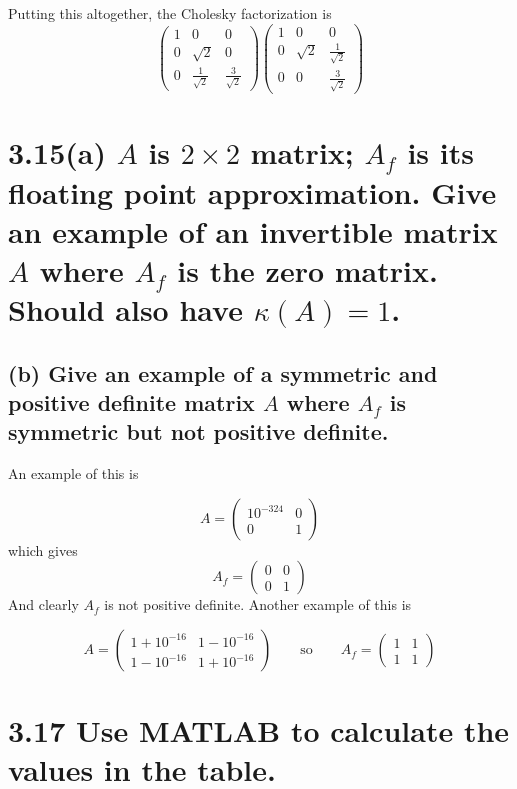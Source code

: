 \documentclass{article}
\begin{document}
Putting this altogether, the Cholesky factorization is
\[
\begin{pmatrix}
  1 & 0 & 0 \\ 0 & \sqrt{2} & 0 \\ 0 & \frac{1}{\sqrt{2}} & \frac{3}{\sqrt{2}}
\end{pmatrix}
\begin{pmatrix}
  1 & 0 & 0 \\ 0 & \sqrt{2} & \frac{1}{\sqrt{2}} \\ 0 & 0 & \frac{3}{\sqrt{2}}
\end{pmatrix}
\]

\section*{3.15(a) \normalsize $A$ is $2 \times 2$ matrix; $A_f$ is its floating point approximation. Give an example of an invertible matrix $A$ where $A_f$ is the zero matrix. Should also have $\kappa(A) = 1$.}




\subsection*{(b) \normalsize Give an example of a symmetric and positive definite matrix $A$ where $A_f$ is symmetric but not positive definite.}

An example of this is 

\[
  A = 
  \begin{pmatrix}
    10^{-324} & 0 \\ 0 & 1
  \end{pmatrix}
\]
which gives 
\[
  A_f = 
  \begin{pmatrix}
    0 & 0 \\ 0 & 1
  \end{pmatrix}
\]
And clearly $A_f$ is not positive definite. Another example of this is 

\[ A =
\begin{pmatrix} 
  1 + 10^{-16} & 1 - 10^{-16} \\ 1 - 10^{-16} & 1 + 10^{-16}
\end{pmatrix}
\qquad \text{so} \qquad 
A_f =
\begin{pmatrix}
  1 & 1 \\ 1 & 1
\end{pmatrix}
\]

\section*{3.17 \normalsize Use MATLAB to calculate the values in the table.}
\end{document}
